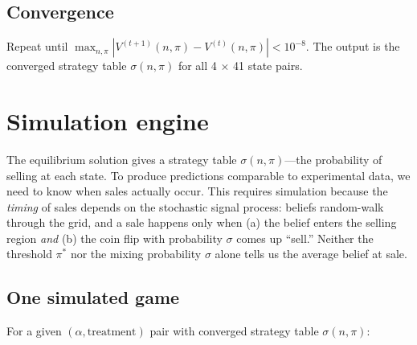 \documentclass[11pt]{article}
\begin{document}
\subsection{Convergence}

Repeat until $\max_{n,\pi} |V^{(t+1)}(n,\pi) - V^{(t)}(n,\pi)| < 10^{-8}$.
The output is the converged strategy table $\sigma(n, \pi)$ for all 4 $\times$
41 state pairs.

\section{Simulation engine}

The equilibrium solution gives a strategy table $\sigma(n, \pi)$---the
probability of selling at each state. To produce predictions comparable to
experimental data, we need to know when sales actually occur. This requires
simulation because the \textit{timing} of sales depends on the stochastic
signal process: beliefs random-walk through the grid, and a sale happens only
when (a) the belief enters the selling region \textit{and} (b) the coin flip
with probability $\sigma$ comes up ``sell.'' Neither the threshold $\pi^*$ nor
the mixing probability $\sigma$ alone tells us the average belief at sale.

\subsection{One simulated game}

For a given $(\alpha, \text{treatment})$ pair with converged strategy table
$\sigma(n, \pi)$:
\end{document}
